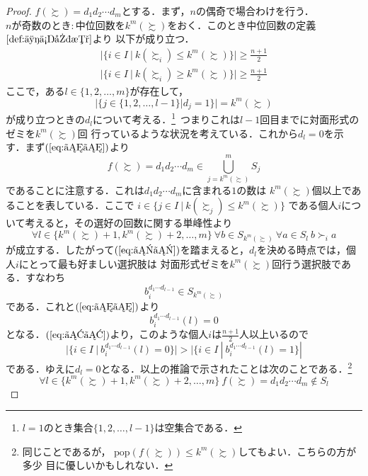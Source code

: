 \documentclass[dvipdfmx]{jsarticle}
\begin{document}
\begin{proof}
  $f(\succsim) = d_{1}d_{2}\cdots d_{m}$とする．まず，$n$の偶奇で場合わけを行う．\\
  $n$が奇数のとき$\colon$中位回数を$k^m(\succsim)$をおく．このとき中位回数の定義~$\ref{def:中位回数}$より
  以下が成り立つ．
  \begin{gather}
    |\{ i \in I \ | \ k(\succsim_i) \leq k^{m}(\succsim) \}|  \geq \frac{n+1}{2} \label{eq:ああ}\\ 
    |\{ i \in I \ | \ k(\succsim_i) \geq k^{m}(\succsim) \}|  \geq \frac{n+1}{2} \label{eq:いい}
  \end{gather}
  ここで，ある$l \in \{1,2,\ldots,m\}$が存在して，
  \begin{equation}\label{eq:うう}
    |\{ j \in \{1,2,\ldots,l-1\} | d_j = 1 \}| = k^{m}(\succsim)
  \end{equation}
  が成り立つときの$d_l$について考える．\<\footnote{$l=1$のとき集合$\{1,2,\ldots,l-1\}$は空集合である．}\
  つまりこれは$l-1$回目までに対面形式のゼミを$k^{m}(\succsim)$回
  行っているような状況を考えている．これから$d_l=0$を示す．まず$(\ref{eq:うう})$より
  \begin{equation}\label{eq:かか}
    f(\succsim) = d_{1}d_{2}\cdots d_{m} \in \bigcup_{j=k^{m}(\succsim)}^{m}S_j
  \end{equation}
  であることに注意する．これは$d_{1}d_{2}\cdots d_{m}$に含まれる$1$の数は
  $k^{m}(\succsim)$個以上であることを表している．ここで
  \mbox{$i \in \{j \in I \ | \ k(\succsim_j) \leq k^{m}(\succsim) \}$}
  である個人$i$について考えると，その選好の回数に関する単峰性より
  \[
    \forall l \in \{k^m(\succsim)+1,k^m(\succsim)+2, \ldots, m\} \ \forall b \in S_{k^m(\succsim)}
    \ \forall a \in S_l \ b \succ_i a
  \]
  が成立する．したがって$(\ref{eq:かか})$を踏まえると，$d_l$を決める時点では，個人$i$にとって最も好ましい選択肢は
  対面形式ゼミを$k^m(\succsim)$回行う選択肢である．すなわち
  \[
    b_{i}^{d_{1}\cdots d_{l-1}} \in S_{k^m(\succsim)}
  \]
  である．これと$(\ref{eq:うう})$より
  \[
    b_{i}^{d_{1}\cdots d_{l-1}}(l) = 0
  \]
  となる．$(\ref{eq:ああ})$より，このような個人$i$は$\frac{n+1}{2}$人以上いるので
  \[
    |\{i \in I \ | \ b_{i}^{d_{1}\cdots d_{l-1}}(l) = 0 \}| >
    |\{i \in I \ | \ b_{i}^{d_{1}\cdots d_{l-1}}(l) = 1 \}|
  \]
  である．ゆえに$d_l=0$となる．以上の推論で示されたことは次のことである．\<\footnote{同じことであるが，
  $\mathrm{pop}(f(\succsim)) \leq k^m(\succsim)$してもよい．こちらの方が多少
  目に優しいかもしれない．}\
  \begin{equation}\label{eq:A}
    \forall l \in \{k^m(\succsim)+1,k^m(\succsim)+2, \ldots, m\} \ f(\succsim) = d_{1}d_{2}\cdots d_{m} \notin S_l

\end{equation}
\end{proof}
\end{document}
